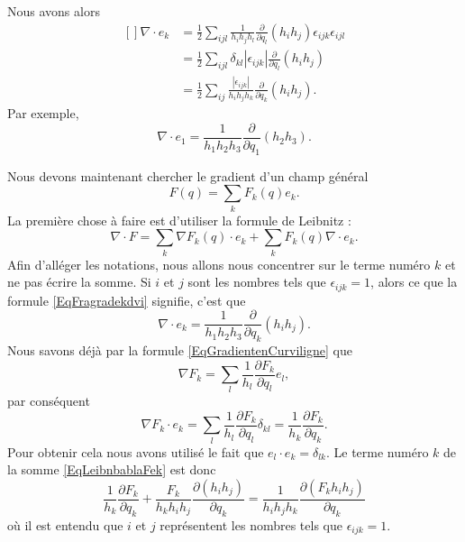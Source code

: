 Nous avons alors
\begin{equation}        \label{EqFragradekdvi}
    \begin{aligned}[]
        \nabla\cdot e_k&=\frac{ 1 }{2}\sum_{ijl}\frac{1}{ h_ih_jh_l }\frac{ \partial  }{ \partial q_l }(h_ih_j)\epsilon_{ijk}\epsilon_{ijl}\\
        &=\frac{ 1 }{2}\sum_{ijl}\delta_{kl}| \epsilon_{ijk} |\frac{ \partial  }{ \partial q_l }(h_ih_j)\\
        &=\frac{ 1 }{2}\sum_{ij}\frac{| \epsilon_{ijk} |}{ h_ih_jh_k }\frac{ \partial  }{ \partial q_k }(h_ih_j).
    \end{aligned}
\end{equation}
Par exemple,
\begin{equation}
    \nabla\cdot e_1=\frac{1}{ h_1h_2h_3 }\frac{ \partial  }{ \partial q_1 }(h_2h_3).
\end{equation}

Nous devons maintenant chercher le gradient d'un champ général
\begin{equation}
    F(q)=\sum_kF_k(q)e_k.
\end{equation}
La première chose à faire est d'utiliser la formule de Leibnitz :
\begin{equation}        \label{EqLeibnbablaFek}
    \nabla\cdot F=\sum_k\nabla F_k(q)\cdot e_k+\sum_kF_k(q)\nabla\cdot e_k.
\end{equation}
Afin d'alléger les notations, nous allons nous concentrer sur le terme numéro $k$ et ne pas écrire la somme. Si $i$ et $j$ sont les nombres tels que $\epsilon_{ijk}=1$, alors ce que la formule \eqref{EqFragradekdvi} signifie, c'est que
\begin{equation}
    \nabla\cdot e_k=\frac{1}{ h_1h_2h_3 }\frac{ \partial  }{ \partial q_k }(h_ih_j).
\end{equation}
Nous savons déjà par la formule \eqref{EqGradientenCurviligne} que
\begin{equation}
    \nabla F_k=\sum_l\frac{1}{ h_l }\frac{ \partial F_k }{ \partial q_l }e_l,
\end{equation}
par conséquent
\begin{equation}
    \nabla F_k\cdot e_k=\sum_l\frac{1}{ h_l }\frac{ \partial F_k }{ \partial q_l }\delta_{kl}=\frac{1}{ h_k }\frac{ \partial F_k }{ \partial q_k }.
\end{equation}
Pour obtenir cela nous avons utilisé le fait que $e_l\cdot e_k=\delta_{lk}$. Le terme numéro $k$ de la somme \eqref{EqLeibnbablaFek} est donc
\begin{equation}
    \frac{1}{ h_k }\frac{ \partial F_k }{ \partial q_k }+\frac{ F_k }{ h_kh_ih_j }\frac{ \partial (h_ih_j) }{ \partial q_k }=\frac{1}{ h_ih_jh_k }\frac{ \partial (F_kh_ih_j) }{ \partial q_k }
\end{equation}
où il est entendu que $i$ et $j$ représentent les nombres tels que $\epsilon_{ijk}=1$.

